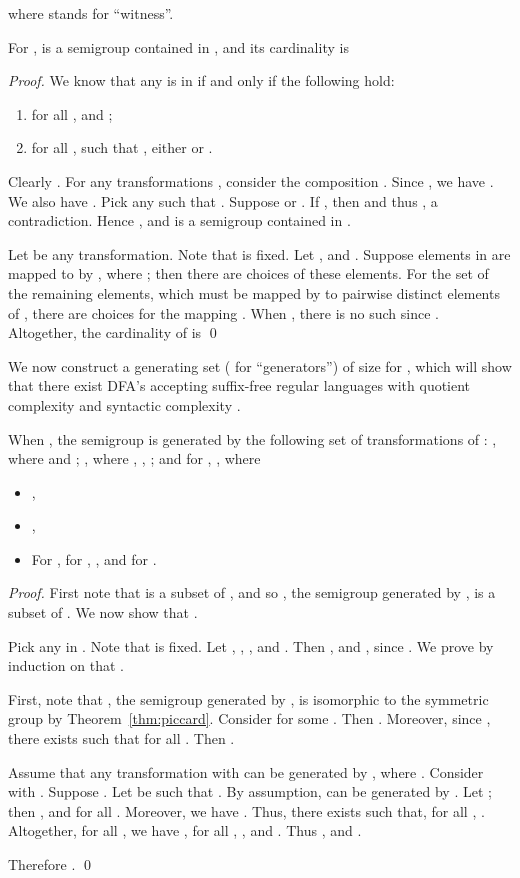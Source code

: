 \documentclass{llncs}
\newcommand{\bi}{\begin{itemize}}
\newcommand{\ei}{\end{itemize}}
\newcommand{\be}{\begin{enumerate}}
\newcommand{\ee}{\end{enumerate}}
\begin{document}
where  stands for ``witness''.

\begin{proposition}\label{prop:Pncard}
For ,  is a semigroup contained in , and its cardinality is

\end{proposition}

\begin{proof}

We know that any  is in  if and only if the following hold: 
\be
\item  for all , and ; 
\item for all  , such that ,  either  or . 
\ee

Clearly . For any transformations , consider the composition . Since , we have . 
We also have . Pick any  such that .  
Suppose  or . 
If , then  and thus , a contradiction. Hence , and  is a semigroup contained in . 

Let  be any transformation. 
Note that  is fixed. 
Let , and . Suppose  elements in  are mapped to  by , where ; then there are  choices of these elements. For the set  of the remaining  elements, which must be mapped by  to pairwise distinct elements of , there are  choices for the mapping . When , there is no such  since . 
Altogether, the cardinality of  is 
   \qed
\end{proof}


We now construct a generating set  ( for ``generators'') of size  for , which will show that there exist DFA's accepting suffix-free regular languages with quotient complexity  and syntactic complexity .


\begin{proposition}\label{prop:Pgen}
When , the semigroup  is generated by the following set  of transformations of :
, where  and ; , where , , ; and for , , where


\bi
\item ,
\item ,
\item For ,  for , , and  for .
\ei

\end{proposition}


\begin{proof}
First note that  is a subset of , and so , the semigroup generated by , is a subset of . We now show that . 

Pick any  in . Note that  is fixed. 
Let , ,  , and . Then , and , since .  We prove by induction on  that . 

First, note that , the semigroup generated by , is isomorphic to the symmetric group  by Theorem~\ref{thm:piccard}. Consider  for some . Then . Moreover, since , there exists  such that  for all . Then .

Assume that any transformation  with  can be generated by , where . 
Consider  with . 
Suppose . 
Let  be such that . By assumption,  can be generated by . 
Let ; 
then , and  for all . 
Moreover, we have .
Thus, there exists  such that, 
for all , . 
Altogether, for all , we have , for all , , and . Thus , and .


Therefore . \qed
\end{proof}
\end{document}
